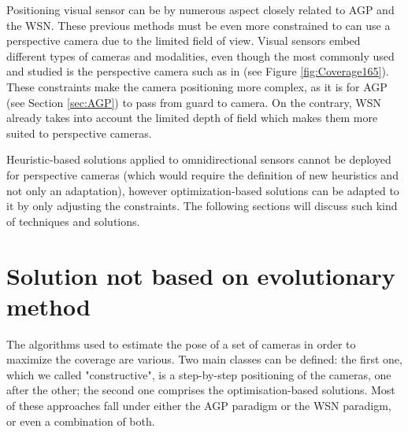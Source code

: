 Positioning visual sensor can be by numerous aspect closely related to AGP and the WSN.
These previous methods must be even more constrained to can use a perspective camera due to the limited field of view.  
Visual sensors embed different types of cameras and  modalities, even though the most commonly used and studied is the perspective camera such  as in \citep{149*mavrinac2013,174*zhang2016,193*fu2014,42*bulusu2001,165*jiang2010} (see Figure \ref{fig:Coverage165}). 
  These constraints make the camera positioning more complex, as it is for AGP (see Section \ref{sec:AGP}) to pass from guard to camera.
   On the contrary, WSN already takes into account the  limited depth of field  which  makes them more  suited  to perspective cameras.
   
Heuristic-based solutions applied to omnidirectional sensors cannot be deployed for perspective cameras (which would require the definition of new heuristics and not only an adaptation), however optimization-based solutions can be adapted to it by only adjusting the constraints. The following sections will discuss such kind of techniques and solutions. 
 
 
 
  

	\section{Solution not based on evolutionary method}\label{sec:NonEAmethod}
	
The algorithms used to estimate the pose of a set of cameras in order to maximize the coverage are various. Two main classes can be defined: the first one, which we called "constructive", is a step-by-step positioning of the cameras, one after the other; the second one comprises the optimisation-based solutions. Most of these approaches fall under either the AGP paradigm or the WSN paradigm, or even a combination of both.\\


